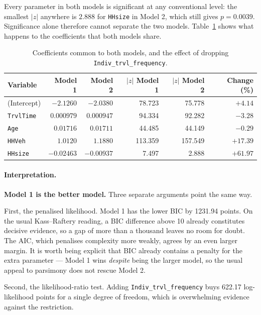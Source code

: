 \documentclass[11pt,a4paper]{article}
\newcommand{\code}[1]{\texttt{#1}}
\begin{document}
Every parameter in both models is significant at any conventional level: the smallest
$|z|$ anywhere is $2.888$ for \code{HHsize} in Model 2, which still gives $p = 0.0039$.
Significance alone therefore cannot separate the two models. Table~\ref{tab:shift} shows
what happens to the coefficients that both models share.

\begin{table}[H]
\centering
\caption{Coefficients common to both models, and the effect of dropping
\code{Indiv\_trvl\_frequency}.}
\label{tab:shift}
\begin{tabular}{lrrrrr}
\toprule
Variable & Model 1 & Model 2 & $|z|$ Model 1 & $|z|$ Model 2 & Change (\%) \\
\midrule
(Intercept)        & $-2.1260$ & $-2.0380$ & 78.723  & 75.778  & $+4.14$ \\
\code{TrvlTime}    & $0.000979$ & $0.000947$ & 94.334  & 92.282  & $-3.28$ \\
\code{Age}         & $0.01716$ & $0.01711$ & 44.485  & 44.149  & $-0.29$ \\
\code{HHVeh}       & $1.0120$  & $1.1880$  & 113.359 & 157.549 & $+17.39$ \\
\code{HHsize}      & $-0.02463$ & $-0.00937$ & 7.497   & 2.888   & $+61.97$ \\
\bottomrule
\end{tabular}
\end{table}

\paragraph{Interpretation.} \textbf{Model 1 is the better model.} Three separate arguments
point the same way.

First, the penalised likelihood. Model 1 has the lower BIC by 1231.94 points. On the usual
Kass--Raftery reading, a BIC difference above 10 already constitutes decisive evidence, so
a gap of more than a thousand leaves no room for doubt. The AIC, which penalises
complexity more weakly, agrees by an even larger margin. It is worth being explicit that
BIC already contains a penalty for the extra parameter --- Model 1 wins \emph{despite}
being the larger model, so the usual appeal to parsimony does not rescue Model 2.

Second, the likelihood-ratio test. Adding \code{Indiv\_trvl\_frequency} buys 622.17
log-likelihood points for a single degree of freedom, which is overwhelming evidence
against the restriction.
\end{document}
